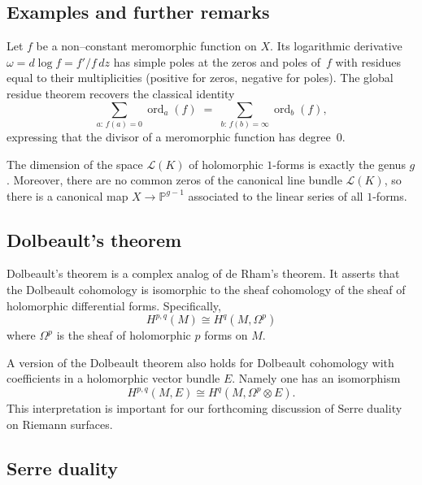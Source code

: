 \documentclass[12pt]{article}
\begin{document}
    \subsection{Examples and further remarks}
    \begin{example}
    Let $f$ be a non--constant meromorphic function on $X$.  Its logarithmic derivative $\omega = d\!\log f = f'/f\,dz$ has simple poles at the zeros and poles of~$f$ with residues equal to their multiplicities (positive for zeros, negative for poles).  The global residue theorem recovers the classical identity
    \[
      \sum_{a:\,f(a)=0} \operatorname{ord}_{a}(f) \;=\; \sum_{b:\,f(b)=\infty} \operatorname{ord}_{b}(f),
    \]
    expressing that the divisor of a meromorphic function has degree~$0$.
    \end{example}
    


\begin{proposition}
    The dimension of the space $\mathcal{L}(K)$ of holomorphic $1$-forms is exactly the genus $g$. Moreover, there are no common zeros of the canonical line bundle $\mathcal{L}(K)$, so there is a canonical map $X \to \mathbb{P}^{g-1}$ associated to the linear series of all $1$-forms.
    \end{proposition}


\subsection{Dolbeault's theorem} \label{sec:dolbeault}

    Dolbeault's theorem is a complex analog of de Rham's theorem. It asserts that the Dolbeault cohomology is isomorphic to the sheaf cohomology of the sheaf of holomorphic differential forms. Specifically,
    \[
    H^{p,q}(M) \cong H^q(M, \Omega^p)
    \]
    where $\Omega^p$ is the sheaf of holomorphic $p$ forms on $M$.
    
    A version of the Dolbeault theorem also holds for Dolbeault cohomology with coefficients in a holomorphic vector bundle $E$. Namely one has an isomorphism
    \[
    H^{p,q}(M, E) \cong H^q(M, \Omega^p \otimes E).
    \]
This interpretation is important for our forthcoming discussion of Serre duality on Riemann surfaces.

\subsection{Serre duality}
\end{document}
